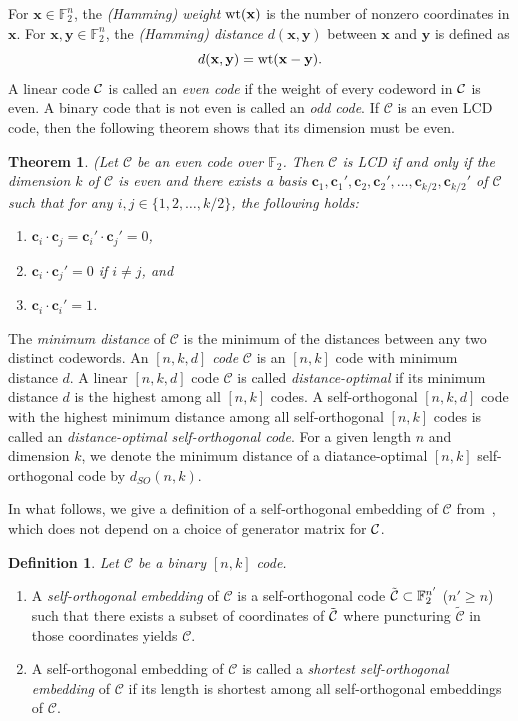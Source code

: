 \documentclass{article}
\newtheorem{theorem}{Theorem}[section]
\theoremstyle{definition}
\newtheorem{defn}{Definition}[section]
\theoremstyle{remark}
\newcommand{\C}{\mbox{$\cal C$}}
\def\CC{{\mathcal C}}
\def\x{{\mathbf x}}
\def\y{{\mathbf y}}
\begin{document}
For $\x\in \mathbb{F}_2^n$, the {\it (Hamming) weight} ${\rm wt}(\x)$ is the number of nonzero coordinates in $\x$. For $\x,\y \in \mathbb{F}_2^n$, the {\it (Hamming) distance} $d(\x,\y)$ between $\x$ and $\y$ is defined as 
\[
d(\x, \y)={\rm wt}(\x-\y).
\]
A linear code $\C$ is called an {\it even code} if the weight of every codeword in $\C$ is even. A binary code that is not even is called an \textit{odd code}. If $\mathcal{C}$ is an even LCD code, then the following theorem shows that its dimension must be even.
\begin{theorem}{\rm(\cite[Theorem 5]{CMTQ-2019-1}}\label{LCDbasis}
Let $\mathcal{C}$ be an even code over $\mathbb{F}_2$. Then $\mathcal{C}$ is LCD if and only if the dimension $k$ of $\mathcal{C}$ is even and there exists a basis $\mathbf{c}_1, \mathbf{c}_1', \mathbf{c}_2, \mathbf{c}_2',\ldots, \mathbf{c}_{k/2}, \mathbf{c}_{k/2}'$ of $\mathcal{C}$ such that for any $i, j\in\{1, 2, \ldots, k/2\}$, the following holds:
\begin{enumerate}
    \item[(i)] $\mathbf{c}_i\cdot\mathbf{c}_j=\mathbf{c}_i'\cdot\mathbf{c}_j'=0$,
    \item[(ii)] $\mathbf{c}_i\cdot\mathbf{c}_j'=0$ if $i\ne j$, and
    \item[(iii)] $\mathbf{c}_i\cdot\mathbf{c}_i'=1$.
\end{enumerate}
\end{theorem}

The {\it minimum distance} of $\CC$ is the minimum of the distances between any two distinct codewords.
An {\it $[n,k,d]$ code} $\CC$ is an $[n,k]$ code with minimum distance $d$.
A linear $[n,k, d]$ code $\CC$ is called \textit{distance-optimal} if its minimum distance $d$ is the highest among all $[n,k]$ codes. A self-orthogonal $[n,k, d]$ code with the highest minimum distance among all self-orthogonal $[n, k]$ codes is called an \textit{distance-optimal self-orthogonal code}. For a given length $n$ and dimension $k$, we denote the minimum distance of a diatance-optimal $[n, k]$ self-orthogonal code by $d_{SO}(n, k)$.

In what follows, we give a definition of a self-orthogonal embedding of $\CC$ from~\cite{Kim2021}, which does not depend on a choice of generator matrix for $\C$.

\begin{defn}{\em
	Let $\CC$ be a binary $[n,k]$ code.
		\begin{enumerate}
 	\item[{(i)}]  A \emph{self-orthogonal embedding} of $\CC$ is a self-orthogonal code $\tilde{\C} \subset \mathbb F_2^{n'}$ ($n' \ge n$) such that there exists a subset of coordinates of $\tilde{\C}$ where puncturing $\tilde{\mathcal{C}}$ in those coordinates yields $\mathcal{C}$.
    \item[{(ii)}] A self-orthogonal embedding of $\CC$ is called a \emph{shortest self-orthogonal embedding} of $\CC$ if its length is shortest among all self-orthogonal embeddings of $\CC$.
	\end{enumerate}
}	
\end{defn}
\end{document}
